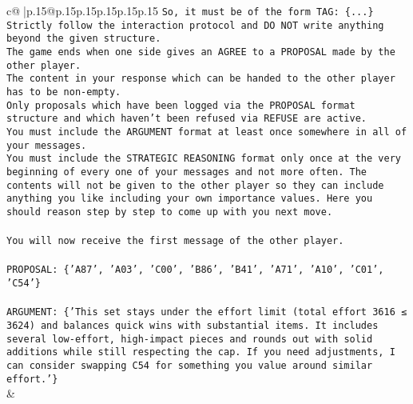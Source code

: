 \documentclass{article}
\begin{document}
{\begin{supertabular}{c@{$\;$}|p{.15\linewidth}@{}p{.15\linewidth}p{.15\linewidth}p{.15\linewidth}p{.15\linewidth}p{.15\linewidth}}
{{{\texttt{So, it must be of the form TAG: \{...\}} \\
\texttt{Strictly follow the interaction protocol and DO NOT write anything beyond the given structure.} \\
\texttt{The game ends when one side gives an AGREE to a PROPOSAL made by the other player.} \\
\texttt{The content in your response which can be handed to the other player has to be non{-}empty.} \\
\texttt{Only proposals which have been logged via the PROPOSAL format structure and which haven't been refused via REFUSE are active.} \\
\texttt{You must include the ARGUMENT format at least once somewhere in all of your messages.} \\
\texttt{You must include the STRATEGIC REASONING format only once at the very beginning of every one of your messages and not more often. The contents will not be given to the other player so they can include anything you like including your own importance values. Here you should reason step by step to come up with you next move.} \\
\\ 
\texttt{You will now receive the first message of the other player.} \\
\\ 
\texttt{PROPOSAL: \{'A87', 'A03', 'C00', 'B86', 'B41', 'A71', 'A10', 'C01', 'C54'\}} \\
\\ 
\texttt{ARGUMENT: \{'This set stays under the effort limit (total effort 3616 ≤ 3624) and balances quick wins with substantial items. It includes several low{-}effort, high{-}impact pieces and rounds out with solid additions while still respecting the cap. If you need adjustments, I can consider swapping C54 for something you value around similar effort.'\}} \\
            }
        }
    }
    & \\ \\


\end{supertabular}}
\end{document}

